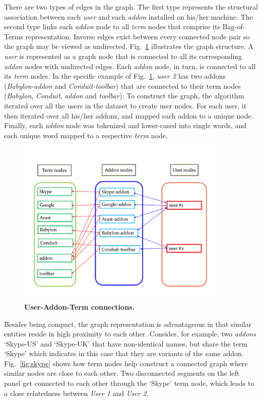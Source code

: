 \documentclass[10pt,letterpaper]{article}
\begin{document}
There are two types of edges in the graph. The first type represents the structural association between each \textit{user} and each \textit{addon} installed on his/her machine. The second type links each \textit{addon} node to all \textit{term} nodes that comprise its Bag-of-Terms representation. Inverse edges exist between every connected node pair so the graph may be viewed as undirected. Fig.~\ref{fig:conn} illustrates the graph structure. A \textit{user} is represented as a graph node that is connected to all its corresponding \textit{addon} nodes with undirected edges. Each \textit{addon} node, in turn, is connected to all its \textit{term} nodes. In the specific example of Fig.~\ref{fig:conn}, \textit{user 2} has two addons (\textit{Babylon-addon} and \textit{Conduit-toolbar}) that are connected to their term nodes (\textit{Babylon},\textit{ Conduit},\textit{ addon} and\textit{ toolbar}). To construct the graph, the algorithm iterated over all the users in the dataset to create user nodes. For each user, it then iterated over all his/her addons, and mapped each addon to a unique node. Finally, each \textit{addon} node was tokenized and lower-cased into single words, and each unique word mapped to a respective \textit{term} node.

\begin{figure}[!h]
\caption{{\bf User-Addon-Term connections.}}
\includegraphics[width=4in]{figures/symbolic_graph.pdf}
\label{fig:conn}
\end{figure}

Besides being compact, the graph representation is advantageous in that similar entities reside in high proximity to each other. Consider, for example, two\textit{ addons} `Skype-US' and `Skype-UK' that have non-identical names, but share the term `Skype' which indicates in this case that they are variants of the same addon. Fig.~\ref{fig:skype} shows how term nodes help construct a connected graph where similar nodes are close to each other. Two disconnected segments on the left panel get connected to each other through the `Skype' term node, which leads to a close relatedness between\textit{ User 1} and\textit{ User 2}. 
\end{document}
